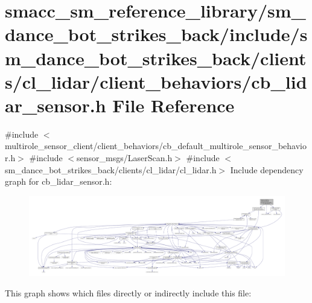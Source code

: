 \hypertarget{sm__dance__bot__strikes__back_2include_2sm__dance__bot__strikes__back_2clients_2cl__lidar_2clien7067a5e29dd906562a154dac82b4ece3}{}\section{smacc\+\_\+sm\+\_\+reference\+\_\+library/sm\+\_\+dance\+\_\+bot\+\_\+strikes\+\_\+back/include/sm\+\_\+dance\+\_\+bot\+\_\+strikes\+\_\+back/clients/cl\+\_\+lidar/client\+\_\+behaviors/cb\+\_\+lidar\+\_\+sensor.h File Reference}
\label{sm__dance__bot__strikes__back_2include_2sm__dance__bot__strikes__back_2clients_2cl__lidar_2clien7067a5e29dd906562a154dac82b4ece3}
{\ttfamily \#include $<$multirole\+\_\+sensor\+\_\+client/client\+\_\+behaviors/cb\+\_\+default\+\_\+multirole\+\_\+sensor\+\_\+behavior.\+h$>$}\newline
{\ttfamily \#include $<$sensor\+\_\+msgs/\+Laser\+Scan.\+h$>$}\newline
{\ttfamily \#include $<$sm\+\_\+dance\+\_\+bot\+\_\+strikes\+\_\+back/clients/cl\+\_\+lidar/cl\+\_\+lidar.\+h$>$}\newline
Include dependency graph for cb\+\_\+lidar\+\_\+sensor.\+h\+:
\nopagebreak
\begin{figure}[H]
\begin{center}
\leavevmode
\includegraphics[width=350pt]{sm__dance__bot__strikes__back_2include_2sm__dance__bot__strikes__back_2clients_2cl__lidar_2clien33b87a97acd19b97ed59821180b85a25}
\end{center}
\end{figure}
This graph shows which files directly or indirectly include this file\+:
\nopagebreak
